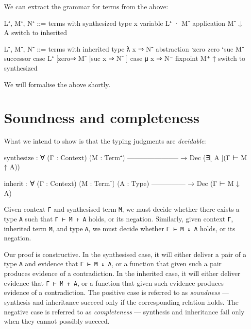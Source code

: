 We can extract the grammar for terms from the above:

\begin{myDisplay}
L⁺, M⁺, N⁺ ::=                      terms with synthesized type
  x                                   variable
  L⁺ · M⁻                             application
  M⁻ ↓ A                              switch to inherited

L⁻, M⁻, N⁻ ::=                      terms with inherited type
  ƛ x ⇒ N⁻                            abstraction
  `zero                               zero
  `suc M⁻                             successor
  case L⁺ [zero⇒ M⁻ |suc x ⇒ N⁻ ]     case
  μ x ⇒ N⁻                            fixpoint
  M⁺ ↑                                switch to synthesized
\end{myDisplay}

We will formalise the above shortly.

\hypertarget{soundness-and-completeness}{%
\section{Soundness and completeness}\label{soundness-and-completeness}}

What we intend to show is that the typing judgments are
\emph{decidable}:

\begin{myDisplay}
synthesize : ∀ (Γ : Context) (M : Term⁺)
    -----------------------
  → Dec (∃[ A ](Γ ⊢ M ↑ A))

inherit : ∀ (Γ : Context) (M : Term⁻) (A : Type)
    ---------------
  → Dec (Γ ⊢ M ↓ A)
\end{myDisplay}

Given context \texttt{Γ} and synthesised term \texttt{M}, we must decide
whether there exists a type \texttt{A} such that \texttt{Γ\ ⊢\ M\ ↑\ A}
holds, or its negation. Similarly, given context \texttt{Γ}, inherited
term \texttt{M}, and type \texttt{A}, we must decide whether
\texttt{Γ\ ⊢\ M\ ↓\ A} holds, or its negation.

Our proof is constructive. In the synthesised case, it will either
deliver a pair of a type \texttt{A} and evidence that
\texttt{Γ\ ⊢\ M\ ↓\ A}, or a function that given such a pair produces
evidence of a contradiction. In the inherited case, it will either
deliver evidence that \texttt{Γ\ ⊢\ M\ ↑\ A}, or a function that given
such evidence produces evidence of a contradiction. The positive case is
referred to as \emph{soundness} --- synthesis and inheritance succeed
only if the corresponding relation holds. The negative case is referred
to as \emph{completeness} --- synthesis and inheritance fail only when
they cannot possibly succeed.

